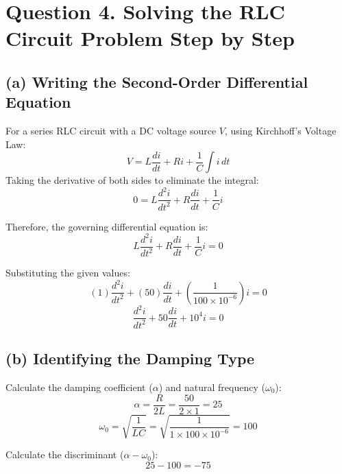 \documentclass[12pt]{article}
\begin{document}
	
	
	
	
	
	
	\section*{Question 4. Solving the RLC Circuit Problem Step by Step}
	
	\subsection*{(a) Writing the Second-Order Differential Equation}
	For a series RLC circuit with a DC voltage source $V$, using Kirchhoff's Voltage Law:
	\begin{equation}
		V = L \frac{di}{dt} + Ri + \frac{1}{C} \int i \, dt
	\end{equation}
	Taking the derivative of both sides to eliminate the integral:
	\begin{equation}
		0 = L \frac{d^2 i}{dt^2} + R \frac{di}{dt} + \frac{1}{C} i
	\end{equation}
	
	Therefore, the governing differential equation is:
	\begin{equation}
		L \frac{d^2 i}{dt^2} + R \frac{di}{dt} + \frac{1}{C} i = 0
	\end{equation}
	
	Substituting the given values:
	\begin{equation}
		(1) \frac{d^2 i}{dt^2} + (50) \frac{di}{dt} + \left( \frac{1}{100 \times 10^{-6}} \right) i = 0
	\end{equation}
	\begin{equation}
		\frac{d^2 i}{dt^2} + 50 \frac{di}{dt} + 10^4 i = 0
	\end{equation}
	
	\subsection*{(b) Identifying the Damping Type}
	Calculate the damping coefficient ($\alpha$) and natural frequency ($\omega_0$):
	\begin{equation}
		\alpha = \frac{R}{2L} = \frac{50}{2 \times 1} = 25
	\end{equation}
	\begin{equation}
		\omega_0 = \sqrt{\frac{1}{LC}} = \sqrt{\frac{1}{1 \times 100 \times 10^{-6}}} = 100
	\end{equation}
	
	Calculate the discriminant ($\alpha - \omega_0$):
	\begin{equation}
		25 - 100= -75
	\end{equation}
	
\end{document}
